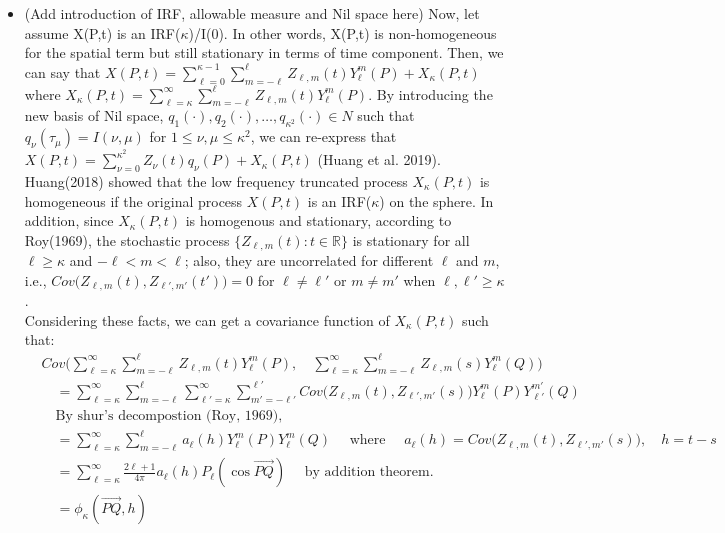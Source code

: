 \documentclass[11pt]{article}
\begin{document}
\begin{itemize}
\item {\color{red}(Add introduction of IRF, allowable measure and Nil space here)} Now, let assume X(P,t) is an IRF($\kappa$)/I(0). In other words, X(P,t) is non-homogeneous for the spatial term but still stationary in terms of time component. Then, we can say that $X(P,t) = \sum_{\ell=0}^{\kappa-1} \sum_{m=-\ell}^{\ell}Z_{\ell,m}(t)Y_\ell^m(P) + X_\kappa(P,t)$ where $X_\kappa(P,t) =  \sum_{\ell=\kappa}^{\infty} \sum_{m=-\ell}^{\ell} Z_{\ell,m}(t) Y_{\ell}^{m}(P).$ By introducing the new basis of Nil space, $q_1(\cdot), q_2(\cdot), \dots, q_{\kappa^2}(\cdot) \in N$ such that $q_\nu(\tau_\mu) = I(\nu, \mu)$ for $1 \le \nu, \mu \le \kappa^2$, we can re-express that $X(P,t) = \sum_{\nu=0}^{\kappa^2} Z_{\nu}(t) q_\nu(P) + X_\kappa(P,t)$ (Huang et al. 2019). Huang(2018) showed that the low frequency truncated process $X_\kappa(P,t)$ is homogeneous if the original process $X(P,t)$ is an IRF($\kappa$) on the sphere. In addition, since $X_{\kappa}(P,t)$ is homogenous and stationary, according to Roy(1969), the stochastic process $\{Z_{\ell,m}(t) : t \in \mathbb{R} \}$ is stationary for all $\ell \ge \kappa$ and $-\ell < m < \ell$; also, they are uncorrelated for different $\ell$ and $m$, i.e., $Cov\biggl(Z_{\ell,m}(t), Z_{\ell',m'}(t')\biggl)=0$ for $\ell \ne \ell'$ or $m \ne m'$ when $\ell, \ell' \ge \kappa$.\\

Considering these facts, we can get a covariance function of $X_\kappa(P,t)$ such that:\\
\begin{align*}
&Cov\biggl(\sum_{\ell=\kappa}^{\infty} \sum_{m=-\ell}^{\ell} Z_{\ell,m}(t) Y_{\ell}^{m}(P),\quad \sum_{\ell=\kappa}^{\infty} \sum_{m=-\ell}^{\ell} Z_{\ell,m}(s) Y_{\ell}^{m}(Q)\biggl)\\
&\quad = \sum_{\ell=\kappa}^{\infty} \sum_{m=-\ell}^{\ell} \sum_{\ell'=\kappa}^{\infty} \sum_{m'=-\ell'}^{\ell'} Cov\biggl( Z_{\ell,m}(t), Z_{\ell',m'}(s) \biggl) Y_{\ell}^{m}(P) Y_{\ell'}^{m'}(Q)\\
&\quad \text{By shur's decompostion (Roy, 1969), }\\
&\quad = \sum_{\ell=\kappa}^{\infty} \sum_{m=-\ell}^{\ell} a_\ell(h) Y_{\ell}^{m}(P) Y_{\ell}^{m}(Q) \quad \text{ where } \quad a_\ell(h)=Cov\biggl( Z_{\ell,m}(t), Z_{\ell',m'}(s) \biggl), \quad h=t-s\\
&\quad = \sum_{\ell=\kappa}^\infty \frac{2\ell+1}{4\pi} a_\ell(h) P_\ell(\cos\overrightarrow{PQ}) \quad \text{ by addition theorem.}\\
&\quad = \phi_\kappa(\overrightarrow{PQ},h)\\
\end{align*}


\end{itemize}
\end{document}
